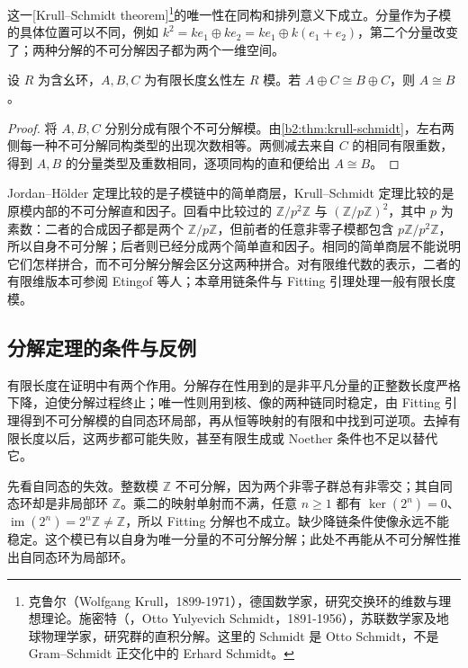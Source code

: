 这一[Krull–Schmidt theorem]\footnote{克鲁尔（Wolfgang Krull，1899-1971），德国数学家，研究交换环的维数与理想理论。施密特（，Otto Yulyevich Schmidt，1891-1956），苏联数学家及地球物理学家，研究群的直积分解。这里的 Schmidt 是 Otto Schmidt，不是 Gram--Schmidt 正交化中的 Erhard Schmidt。}的唯一性在同构和排列意义下成立。分量作为子模的具体位置可以不同，例如 \(k^2=ke_1\oplus ke_2=ke_1\oplus k(e_1+e_2)\)，第二个分量改变了；两种分解的不可分解因子都为两个一维空间。

\begin{corollary}[有限长度模的消去]\label{b2:cor:finite-length-cancellation}
	设 \(R\) 为含幺环，\(A,B,C\) 为有限长度幺性左 \(R\) 模。若 \(A\oplus C\cong B\oplus C\)，则 \(A\cong B\)。
\end{corollary}
\begin{proof}
	将 \(A,B,C\) 分别分成有限个不可分解模。由\cref{b2:thm:krull-schmidt}，左右两侧每一种不可分解同构类型的出现次数相等。两侧减去来自 \(C\) 的相同有限重数，得到 \(A,B\) 的分量类型及重数相同，逐项同构的直和便给出 \(A\cong B\)。
\end{proof}

Jordan–Hölder 定理比较的是子模链中的简单商层，Krull–Schmidt 定理比较的是原模内部的不可分解直和因子。回看中比较过的 \(\mathbb Z/p^2\mathbb Z\) 与 \((\mathbb Z/p\mathbb Z)^2\)，其中 \(p\) 为素数：二者的合成因子都是两个 \(\mathbb Z/p\mathbb Z\)，但前者的任意非零子模都包含 \(p\mathbb Z/p^2\mathbb Z\)，所以自身不可分解；后者则已经分成两个简单直和因子。相同的简单商层不能说明它们怎样拼合，而不可分解分解会区分这两种拼合。对有限维代数的表示，二者的有限维版本可参阅 Etingof 等人\cite[Theorem 3.7.1, pp. 50--51; Theorem 3.8.1, pp. 51--52; Remark 3.8.6, p. 53]{EtingofEtAl2011RepresentationTheory}；本章用链条件与 Fitting 引理处理一般有限长度模。

\subsection{分解定理的条件与反例}
\label{b2:subsec:1204:03}

有限长度在证明中有两个作用。分解存在性用到的是非平凡分量的正整数长度严格下降，迫使分解过程终止；唯一性则用到核、像的两种链同时稳定，由 Fitting 引理得到不可分解模的自同态环局部，再从恒等映射的有限和中找到可逆项。去掉有限长度以后，这两步都可能失败，甚至有限生成或 Noether 条件也不足以替代它。

\ProseParagraphBreak
先看自同态的失效。整数模 \(\mathbb Z\) 不可分解，因为两个非零子群总有非零交；其自同态环却是非局部环 \(\mathbb Z\)。乘二的映射单射而不满，任意 \(n\ge1\) 都有 \(\ker(2^n)=0\)、\(\operatorname{im}(2^n)=2^n\mathbb Z\ne\mathbb Z\)，所以 Fitting 分解也不成立。缺少降链条件使像永远不能稳定。这个模已有以自身为唯一分量的不可分解分解；此处不再能从不可分解性推出自同态环为局部环。

